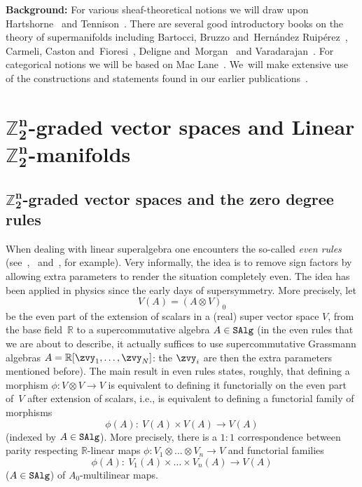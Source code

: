\documentclass[pdftex]{sigma}%
\newcommand{\R}{{\mathbb R}}
\newcommand{\Z}{{\mathbb Z}}
\newcommand{\0}{\otimes}
\numberwithin{equation}{section}
\begin{document}
 \textbf{Background:} For various sheaf-theoretical notions we will draw upon Hartshorne~\cite[Chapter~II]{Hartshorne:1977} and Tennison~\cite{Tennison:1975}. There are several good introductory books on the theory of super\-ma\-ni\-folds including Bartocci, Bruzzo and~Hern\'{a}ndez Ruip\'{e}rez~\cite{Bartocci:1991}, Carmeli, Caston and~Fioresi~\cite{Carmeli:2011}, Deligne and~Morgan~\cite{Deligne:1999} and Varadarajan~\cite{Varadarajan:2004}. For categorical notions we will be based on Mac Lane~\cite{MacLane1998}. We~will make extensive use of the constructions and statements found in our earlier publications~\cite{Bruce:2019b,Bruce:2018,Bruce:2019}.



\section[Z2n-graded vector spaces and Linear Z2n-manifolds]
{$\boldsymbol{\Z_{2}^{n}}$-graded vector spaces and Linear $\boldsymbol{\Z_2^n}$-manifolds}

\subsection[Z2n-graded vector spaces and the zero degree rules]%
{$\boldsymbol{\Z_2^n}$-graded vector spaces and the zero degree rules }
When dealing with linear superalgebra one encounters the so-called \emph{even rules} (see~\cite[Section~1.8]{Carmeli:2011},~\cite[Section~1.7]{Deligne:1999} and~\cite[pp.~123--124]{Varadarajan:2004}, for example). Very informally, the idea is to remove sign factors by allowing extra parameters to render the situation completely even. The idea has been applied in physics since the early days of supersymmetry. More precisely, let
\[
V(A)=(A\otimes V)_0
\]
be the even part of the extension of scalars in a (real) super vector space $V$, from the base field~$\R$ to a supercommutative algebra $A\in\tt SAlg$ (in the even rules that we are about to describe, it actually suffices to use supercommutative Grassmann algebras $A=\R[\zvy_1,\dots, \zvy_N]$: the $\zvy_i$ are then the extra parameters mentioned before). The main result in even rules states, roughly, that defining a morphism $\phi\colon V\0 V\to V$ is equivalent to defining it functorially on the even part of~$V$ after extension of scalars, i.e., is equivalent to defining a functorial family of morphisms
\[
\phi(A)\colon\ V(A)\times V(A)\to V(A)
\]
(indexed by $A\in\tt SAlg$). More precisely, there is a $1:1$ correspondence between parity respecting $\R$-linear maps $\phi\colon V_1\otimes\dots\otimes V_n\to V$ and functorial families
\[
\phi(A)\colon\ V_1(A)\times \dots \times V_n(A)\to V(A)
\]
($A\in\tt SAlg$) of $A_0$-multilinear maps.
\end{document}
